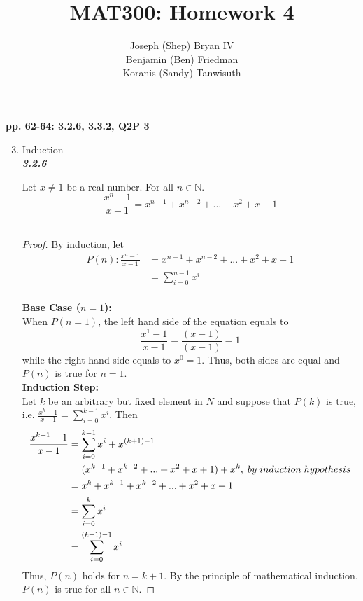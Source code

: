 \documentclass{article}
\begin{document}
\title{MAT300: Homework 4}
\author{
	Joseph (Shep) Bryan IV \\
	Benjamin (Ben) Friedman\\
	Koranis (Sandy) Tanwisuth
}

\maketitle
	\begin{flushleft}
		\textbf{pp. 62-64: 3.2.6, 3.3.2, Q2P 3}
	\begin{enumerate}
		\setcounter{enumi}{2}
		\item Induction \\
		
		\textbf{\textit{3.2.6}}
		\begin{flushleft}
			Let $x \neq 1$ be a real number. For all $n \in \mathbb{N}$. 
			\begin{equation}
				\frac{x^n-1}{x-1} = x^{n-1}+x^{n-2}+...+x^2+x+1
			\end{equation}
			\\
			\begin{proof}
				By induction, let \\
				\begin{align*}
					P(n): \frac{x^n-1}{x-1} & = x^{n-1}+x^{n-2}+...+x^2+x+1 \\
					& = \sum\limits_{i=0}^{n-1} x^i
				\end{align*} \\
				\textbf{Base Case ($n = 1$):}
				\\ When $P(n=1)$, the left hand side of the equation equals to \[\frac{x^1-1}{x-1} = \frac{(x-1)}{(x-1)}  = 1 \]
				while the right hand side equals to $x^0 = 1$. Thus, both sides are equal and $P(n)$ is true for $n=1$.
				\\
				\pagebreak
				\textbf{Induction Step:}
				\\
				Let $k$ be an arbitrary but fixed element in $N$ and suppose that $P(k)$ is true, i.e. $\frac{x^k-1}{x-1} = \sum\limits_{i=0}^{k-1} x^i$. Then
				\begin{align*}
					\frac{x^{k+1}-1}{x-1}
					& = \sum\limits_{i=0}^{k-1} x^i + x^{(k+1)-1} \\
					& = (x^{k-1}+x^{k-2}+...+x^2+x+1) + x^k, \thickspace by \thickspace induction \thickspace hypothesis \\
					& = x^k+x^{k-1}+x^{k-2}+...+x^2+x+1 \\
					& = \sum\limits_{i=0}^{k} x^i \\
					& = \sum\limits_{i=0}^{(k+1)-1} x^i 
				\end{align*}
				Thus, $P(n)$ holds for $n=k+1$. 
				By the principle of mathematical induction, $P(n)$ is true for all $n \in \mathbb{N}$.
			\end{proof}
			

\end{flushleft}
\end{enumerate}
\end{flushleft}
\end{document}
